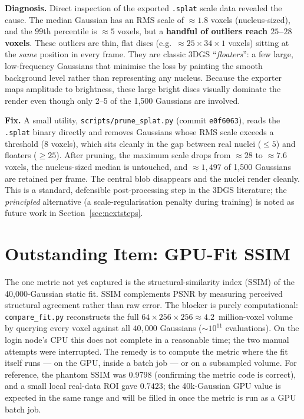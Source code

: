 \documentclass[11pt,a4paper]{article}
\newcommand{\code}[1]{\texttt{#1}}
\begin{document}
\textbf{Diagnosis.}
Direct inspection of the exported \code{.splat} scale data revealed the cause. The median
Gaussian has an RMS scale of \(\approx 1.8\) voxels (nucleus-sized), and the \(99\)th
percentile is \(\approx 5\) voxels, but a \textbf{handful of outliers reach \(25\)--\(28\)
voxels}. These outliers are thin, flat discs (e.g.\ \(\approx 25\times34\times1\) voxels)
sitting at the \emph{same} position in every frame. They are classic 3DGS
``\emph{floaters}'': a few large, low-frequency Gaussians that minimise the loss by
painting the smooth background level rather than representing any nucleus. Because the
exporter maps amplitude to brightness, these large bright discs visually dominate the
render even though only 2--5 of the 1{,}500 Gaussians are involved.

\textbf{Fix.}
A small utility, \code{scripts/prune\_splat.py} (commit \code{e0f6063}), reads the
\code{.splat} binary directly and removes Gaussians whose RMS scale exceeds a threshold
(8 voxels), which sits cleanly in the gap between real nuclei (\(\le 5\)) and floaters
(\(\ge 25\)). After pruning, the maximum scale drops from \(\approx 28\) to \(\approx 7.6\)
voxels, the nucleus-sized median is untouched, and \(\approx 1{,}497\) of 1{,}500
Gaussians are retained per frame. The central blob disappears and the nuclei render
cleanly. This is a standard, defensible post-processing step in the 3DGS literature; the
\emph{principled} alternative (a scale-regularisation penalty during training) is noted as
future work in Section~\ref{sec:nextsteps}.

\section{Outstanding Item: GPU-Fit SSIM}
\label{sec:outstanding}

The one metric not yet captured is the structural-similarity index (SSIM) of the
40{,}000-Gaussian static fit. SSIM complements PSNR by measuring perceived structural
agreement rather than raw error. The blocker is purely computational: \code{compare\_fit.py}
reconstructs the full \(64\times256\times256 \approx 4.2\)~million-voxel volume by querying
every voxel against all \(40{,}000\) Gaussians (\(\sim\!10^{11}\) evaluations). On the
login node's CPU this does not complete in a reasonable time; the two manual attempts were
interrupted. The remedy is to compute the metric where the fit itself runs --- on the GPU,
inside a batch job --- or on a subsampled volume. For reference, the phantom SSIM was
\(0.9798\) (confirming the metric code is correct), and a small local real-data ROI gave
\(0.7423\); the 40k-Gaussian GPU value is expected in the same range and will be filled in
once the metric is run as a GPU batch job.
\end{document}

